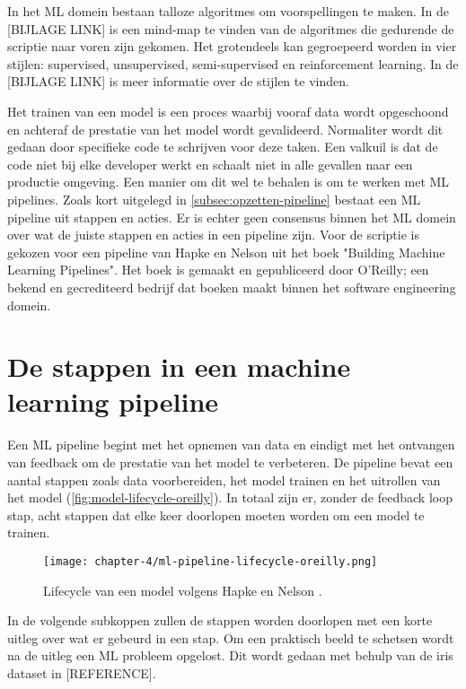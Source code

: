 In het ML domein bestaan talloze algoritmes om voorspellingen te maken. In de [BIJLAGE LINK] is een mind-map te vinden van de algoritmes die gedurende de scriptie naar voren zijn gekomen. Het grotendeels kan gegroepeerd worden in vier stijlen: supervised, unsupervised, semi-supervised en reinforcement learning. In de [BIJLAGE LINK] is meer informatie over de stijlen te vinden.

Het trainen van een model is een proces waarbij vooraf data wordt opgeschoond en achteraf de prestatie van het model wordt gevalideerd. Normaliter wordt dit gedaan door specifieke code te schrijven voor deze taken. Een valkuil is dat de code niet bij elke developer werkt en schaalt niet in alle gevallen naar een productie omgeving. Een manier om dit wel te behalen is om te werken met ML pipelines. Zoals kort uitgelegd in \autoref{subsec:opzetten-pipeline} bestaat een ML pipeline uit stappen en acties. Er is echter geen consensus binnen het ML domein over wat de juiste stappen en acties in een pipeline zijn. Voor de scriptie is gekozen voor een pipeline van Hapke en Nelson uit het boek "Building Machine Learning Pipelines". Het boek is gemaakt en gepubliceerd door O'Reilly; een bekend en gecrediteerd bedrijf dat boeken maakt binnen het software engineering domein.

\section{De stappen in een machine learning pipeline}\label{sec:de-stappen-in-een-machine-learning-pipeline}
Een ML pipeline begint met het opnemen van data en eindigt met het ontvangen van feedback om de prestatie van het model te verbeteren. De pipeline bevat een aantal stappen zoals data voorbereiden, het model trainen en het uitrollen van het model (\autoref{fig:model-lifecycle-oreilly}). In totaal zijn er, zonder de feedback loop stap, acht stappen dat elke keer doorlopen moeten worden om een model te trainen.

\begin{figure}[hbt!]
  \centering
  \texttt{[image: chapter-4/ml-pipeline-lifecycle-oreilly.png]}
  \caption{Lifecycle van een model volgens Hapke en Nelson \cite[p.~4]{building-machine-learning-pipelines-oreilly}.}
  \label{fig:model-lifecycle-oreilly}
\end{figure}

In de volgende subkoppen zullen de stappen worden doorlopen met een korte uitleg over wat er gebeurd in een stap. Om een praktisch beeld te schetsen wordt na de uitleg een ML probleem opgelost. Dit wordt gedaan met behulp van de iris dataset in [REFERENCE].

